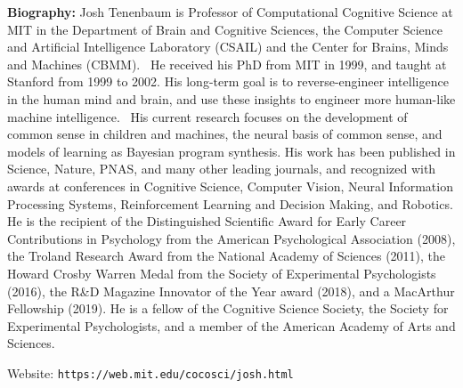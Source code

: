 {\bf Biography:} Josh Tenenbaum is Professor of Computational Cognitive Science at MIT in the Department of Brain and Cognitive Sciences, the Computer Science and Artificial Intelligence Laboratory (CSAIL) and the Center for Brains, Minds and Machines (CBMM).  He received his PhD from MIT in 1999, and taught at Stanford from 1999 to 2002. His long-term goal is to reverse-engineer intelligence in the human mind and brain, and use these insights to engineer more human-like machine intelligence.  His current research focuses on the development of common sense in children and machines, the neural basis of common sense, and models of learning as Bayesian program synthesis. His work has been published in Science, Nature, PNAS, and many other leading journals, and recognized with awards at conferences in Cognitive Science, Computer Vision, Neural Information Processing Systems, Reinforcement Learning and Decision Making, and Robotics. He is the recipient of the Distinguished Scientific Award for Early Career Contributions in Psychology from the American Psychological Association (2008), the Troland Research Award from the National Academy of Sciences (2011), the Howard Crosby Warren Medal from the Society of Experimental Psychologists (2016), the R&D Magazine Innovator of the Year award (2018), and a MacArthur Fellowship (2019). He is a fellow of the Cognitive Science Society, the Society for Experimental Psychologists, and a member of the American Academy of Arts and Sciences.

Website: {\tt https://web.mit.edu/cocosci/josh.html}

\newpage
